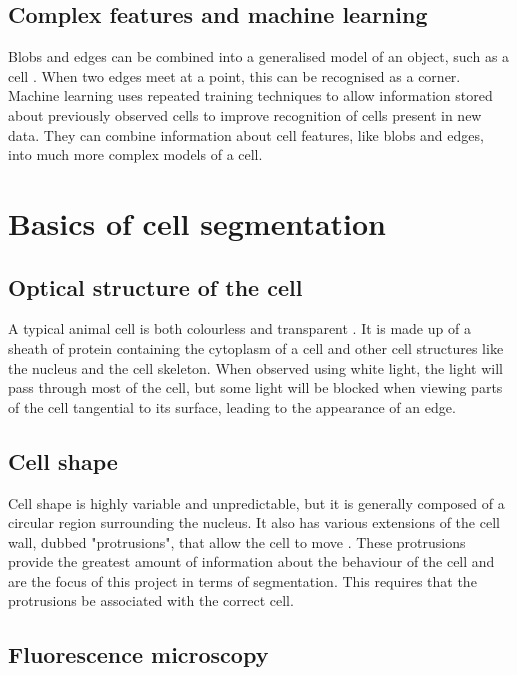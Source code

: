 \subsection{Complex features and machine learning}

Blobs and edges can be combined into a generalised model of an object, such as a cell . When two edges meet at a point, this can be recognised as a corner. Machine learning uses repeated training techniques to allow information stored about previously observed cells to improve recognition of cells present in new data. They can combine information about cell features, like blobs and edges, into much more complex models of a cell.

\section{Basics of cell segmentation}

\subsection{Optical structure of the cell}

A typical animal cell is both colourless and transparent . It is made up of a sheath of protein containing the cytoplasm of a cell and other cell structures like the nucleus and the cell skeleton. When observed using white light, the light will pass through most of the cell, but some light will be blocked when viewing parts of the cell tangential to its surface, leading to the appearance of an edge.

\subsection{Cell shape}

Cell shape is highly variable and unpredictable, but it is generally composed of a circular region surrounding the nucleus. It also has various extensions of the cell wall, dubbed "protrusions", that allow the cell to move . These protrusions provide the greatest amount of information about the behaviour of the cell and are the focus of this project in terms of segmentation. This requires that the protrusions be associated with the correct cell.

\subsection{Fluorescence microscopy}

